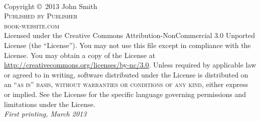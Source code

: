 \documentclass[11pt,fleqn]{book} %
\begin{document}

\begingroup
\thispagestyle{empty}
\vfill
\endgroup


\newpage
~\vfill
\thispagestyle{empty}

\noindent Copyright \copyright\ 2013 John Smith\\ %

\noindent \textsc{Published by Publisher}\\ %

\noindent \textsc{book-website.com}\\ %

\noindent Licensed under the Creative Commons Attribution-NonCommercial 3.0 Unported License (the ``License''). You may not use this file except in compliance with the License. You may obtain a copy of the License at \url{http://creativecommons.org/licenses/by-nc/3.0}. Unless required by applicable law or agreed to in writing, software distributed under the License is distributed on an \textsc{``as is'' basis, without warranties or conditions of any kind}, either express or implied. See the License for the specific language governing permissions and limitations under the License.\\ %

\noindent \textit{First printing, March 2013} %

\end{document}
